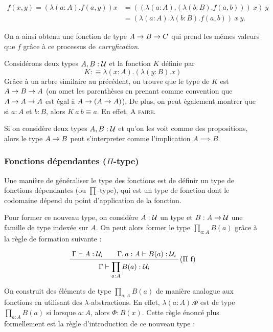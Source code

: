 \documentclass[../../rapport.tex]{subfiles}
\begin{document}
  \begin{align}
    f(x, y) = (\lambda(a : A). f(a, y)) x &= ((\lambda(a : A). (\lambda(b : B). f(a, b)))\ x)\ y \\ 
					  &= (\lambda(a : A).\lambda(b : B). f(a, b))\ x\ y.
  \end{align}

  On a ainsi obtenu une fonction de type $A \rightarrow B \rightarrow C$ qui prend les mêmes valeurs que $f$
  grâce à ce processus de \textit{curryfication}.

  \begin{example}
    Considérons deux types $A, B : \mathcal U$ et la fonction $K$ définie par
    $$K :\equiv \lambda(x : A).(\lambda(y : B).x)$$
    Grâce à un arbre similaire au précédent, on trouve que le type de $K$ est $A \rightarrow B \rightarrow A$
    (on omet les parenthèses en prenant comme convention que $A \rightarrow A \rightarrow A$ est égal à $A \rightarrow (A \rightarrow A)$).
    De plus, on peut également montrer que si $a : A$ et $b : B$, alors $K\ a\ b \equiv a$. En effet, \textsc{A faire.}
  \end{example}

  Si on considère deux types $A, B : \mathcal U$ et qu'on les voit comme des propositions,
  alors le type $A \rightarrow B$ peut s'interpreter comme l'implication $A \implies B$.

  \subsubsection{Fonctions dépendantes ($\Pi$-type)}

  Une manière de généraliser le type des fonctions est de définir un type de fonctions dépendantes (ou $\prod$-type),
  qui est un type de fonction dont le codomaine dépend du point d'application de la fonction.

  Pour former ce nouveau type, on considère $A : \mathcal U$ un type et $B : A \rightarrow \mathcal U$ une famille de type indexée sur $A$.
  On peut alors former le type $\prod_{a : A}{B(a)}$ grâce à la règle de formation suivante :

  $$
  \prfinterspace=2em
  \prftree[r]{($\Pi$ f)}{\Gamma \vdash A : \U_i}{\Gamma, a : A \vdash B(a) : \U_i}
    {\Gamma \vdash \prod_{a:A}{B(a)} : \U_i}
  $$

  On construit des éléments de type $\prod_{a:A}{B(a)}$ de manière analogue aux fonctions en utilisant des $\lambda$-abstractions.
  En effet, $\lambda(a : A). \Phi$ est de type $\prod_{a:A}{B(a)}$ si lorsque $a : A$, alors $\Phi : B(x)$.
  Cette règle énoncé plus formellement est la règle d'introduction de ce nouveau type :
\end{document}
